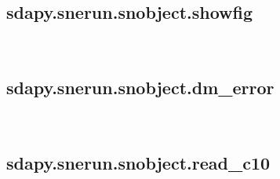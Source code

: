 \documentclass[letterpaper,10pt,english]{sphinxmanual}
\begin{document}
\begin{fulllineitems}
\label{\detokenize{generated/sdapy.snerun.snobject.savefig:sdapy.snerun.snobject.savefig}}~
\end{fulllineitems}



\subsection{sdapy.snerun.snobject.showfig}
\label{\detokenize{generated/sdapy.snerun.snobject.showfig:sdapy-snerun-snobject-showfig}}\label{\detokenize{generated/sdapy.snerun.snobject.showfig::doc}}

\begin{fulllineitems}
\label{\detokenize{generated/sdapy.snerun.snobject.showfig:sdapy.snerun.snobject.showfig}}~
\end{fulllineitems}



\subsection{sdapy.snerun.snobject.dm\_error}
\label{\detokenize{generated/sdapy.snerun.snobject.dm_error:sdapy-snerun-snobject-dm-error}}\label{\detokenize{generated/sdapy.snerun.snobject.dm_error::doc}}

\begin{fulllineitems}
\label{\detokenize{generated/sdapy.snerun.snobject.dm_error:sdapy.snerun.snobject.dm_error}}~
\end{fulllineitems}



\subsection{sdapy.snerun.snobject.read\_c10}
\label{\detokenize{generated/sdapy.snerun.snobject.read_c10:sdapy-snerun-snobject-read-c10}}\label{\detokenize{generated/sdapy.snerun.snobject.read_c10::doc}}
\end{document}
